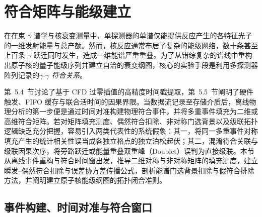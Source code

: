 \section{符合矩阵与能级建立}\label{sec:5-6}

在在束 $\gamma$ 谱学与核衰变测量中，单探测器的单谱仅能提供反应产生的各特征光子的一维发射能量与总产额。然而，核反应通常布居了复杂的能级网络，数十条甚至上百条 $\gamma$ 跃迁同时发生，造成一维能谱严重重叠。为了从错综复杂的谱线中重构出原子核的量子能级序列并建立自洽的衰变纲图，核心的实验手段是利用多探测器阵列记录的\emph{$\gamma\text{-}\gamma$ 符合关系}。

第~5.4~节讨论了基于 CFD 过零插值的高精度时间戳提取，第~5.5~节阐明了硬件触发、FIFO 缓存与联合活时间的因果界限。当数据流记录至存储介质后，离线物理分析的第一步便是通过时间对准构建物理符合事件，并将多重事件填充为二维或高维符合矩阵。若对矩阵填充测度、偶然符合扣除、非对称门选背景以及级联拓扑逻辑缺乏充分把握，容易引入两类代表性的系统假象：其一，将同一多重事件对称填充产生的统计相关性误当成各独立格点的独立泊松起伏；其二，混淆符合关联与级联因果次序，将旁路跃迁或能量重叠双重峰（Doublet）误判为直接级联。本节从离线事件重构与符合时间窗出发，推导二维对称与非对称矩阵的填充测度，建立瞬发--偶然符合扣除与误差协方差传播公式，剖析能谱门选背景扣除与假符合排除方法，并阐明建立原子核能级纲图的拓扑闭合准则。

\subsection{事件构建、时间对准与符合窗口}\label{subsec:5-6-1}

